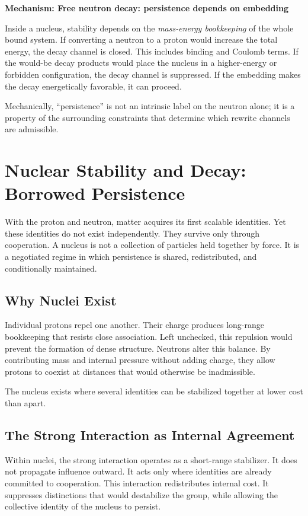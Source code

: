 \documentclass[11pt,twoside,openright]{book}
\newenvironment{mechanismboxpage}[1]
  {\par\medskip
   \noindent
   \begin{minipage}{\linewidth}
   \begin{framed}
   \noindent\textbf{Mechanism: #1}\par\medskip}
  {\end{framed}
   \end{minipage}
   \par\medskip}
\begin{document}
\begin{mechanismboxpage}{Free neutron decay: persistence depends on embedding}

Inside a nucleus, stability depends on the \emph{mass-energy bookkeeping} of the whole bound system. If converting a neutron to a proton would increase the total energy, the decay channel is closed. This includes binding and Coulomb terms. If the would-be decay products would place the nucleus in a higher-energy or forbidden configuration, the decay channel is suppressed. If the embedding makes the decay energetically favorable, it can proceed.

Mechanically, ``persistence'' is not an intrinsic label on the neutron alone; it is a property of the surrounding constraints that determine which rewrite channels are admissible.
\end{mechanismboxpage}
\chapter{Nuclear Stability and Decay: Borrowed Persistence}

With the proton and neutron, matter acquires its first scalable identities. Yet these identities do not exist independently. They survive only through cooperation. A nucleus is not a collection of particles held together by force. It is a negotiated regime in which persistence is shared, redistributed, and conditionally maintained.

\section*{Why Nuclei Exist}

Individual protons repel one another. Their charge produces long-range bookkeeping that resists close association. Left unchecked, this repulsion would prevent the formation of dense structure. Neutrons alter this balance. By contributing mass and internal pressure without adding charge, they allow protons to coexist at distances that would otherwise be inadmissible.

The nucleus exists where several identities can be stabilized together at lower cost than apart.

\section*{The Strong Interaction as Internal Agreement}

Within nuclei, the strong interaction operates as a short-range stabilizer. It does not propagate influence outward. It acts only where identities are already committed to cooperation. This interaction redistributes internal cost. It suppresses distinctions that would destabilize the group, while allowing the collective identity of the nucleus to persist.
\end{document}
